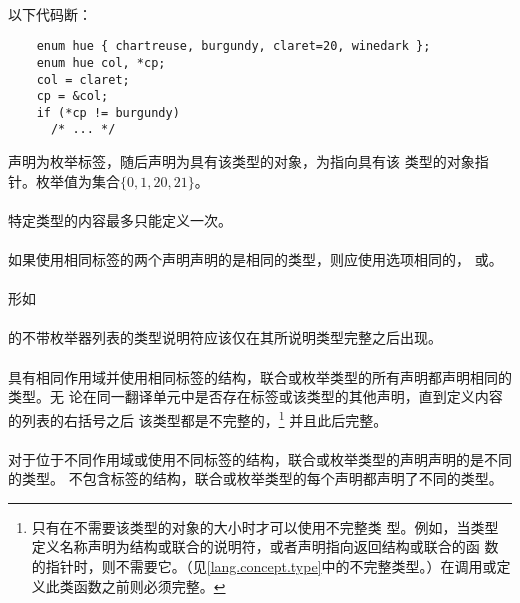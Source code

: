 \paragraph{}
\ex* 以下代码断：
\begin{lstlisting}
    enum hue { chartreuse, burgundy, claret=20, winedark };
    enum hue col, *cp;
    col = claret;
    cp = &col;
    if (*cp != burgundy)
      /* ... */
\end{lstlisting}
声明为枚举标签，随后声明为具有该类型的对象，为指向具有该
类型的对象指针。枚举值为集合$\{0, 1, 20, 21\}$。


\constraint
\paragraph{}
特定类型的内容最多只能定义一次。

\paragraph{}
如果使用相同标签的两个声明声明的是相同的类型，则应使用选项相同的，
或。

\paragraph{}
形如                                                                          \\
\mbox{\hspace{4em} }                                  \\
的不带枚举器列表的类型说明符应该仅在其所说明类型完整之后出现。

\semantic
\paragraph{}
具有相同作用域并使用相同标签的结构，联合或枚举类型的所有声明都声明相同的类型。无
论在同一翻译单元中是否存在标签或该类型的其他声明，直到定义内容的列表的右括号之后
该类型都是不完整的，\footnote{只有在不需要该类型的对象的大小时才可以使用不完整类
型。例如，当类型定义名称声明为结构或联合的说明符，或者声明指向返回结构或联合的函
数的指针时，则不需要它。（见\ref{lang.concept.type}中的不完整类型。）在调用或定
义此类函数之前则必须完整。} 并且此后完整。

\paragraph{}
对于位于不同作用域或使用不同标签的结构，联合或枚举类型的声明声明的是不同的类型。
不包含标签的结构，联合或枚举类型的每个声明都声明了不同的类型。

